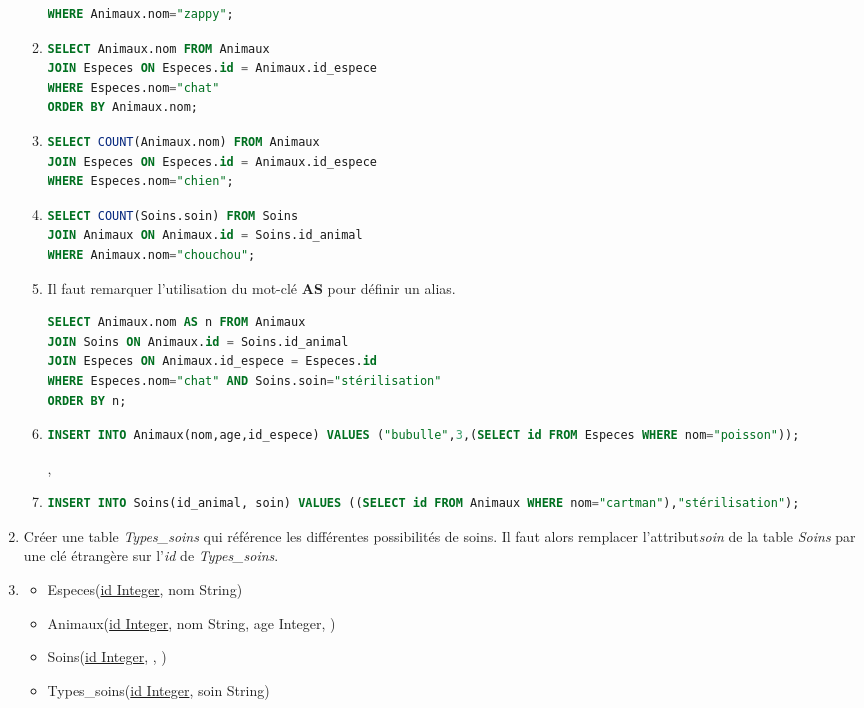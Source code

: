 \documentclass[a4paper,11pt]{article}
\begin{document}
\begin{Form}
\begin{exo}
\begin{enumerate}
\begin{enumerate}
\begin{lstlisting}[language=SQL]
WHERE Animaux.nom="zappy";
\end{lstlisting}
\item 
\begin{lstlisting}[language=SQL]
SELECT Animaux.nom FROM Animaux
JOIN Especes ON Especes.id = Animaux.id_espece
WHERE Especes.nom="chat"
ORDER BY Animaux.nom;
\end{lstlisting}
\item 
\begin{lstlisting}[language=SQL]
SELECT COUNT(Animaux.nom) FROM Animaux
JOIN Especes ON Especes.id = Animaux.id_espece
WHERE Especes.nom="chien";
\end{lstlisting}
\item 
\begin{lstlisting}[language=SQL]
SELECT COUNT(Soins.soin) FROM Soins
JOIN Animaux ON Animaux.id = Soins.id_animal
WHERE Animaux.nom="chouchou";
\end{lstlisting}
\item Il faut remarquer l'utilisation du mot-clé \textbf{AS} pour définir un alias.
\begin{lstlisting}[language=SQL]
SELECT Animaux.nom AS n FROM Animaux
JOIN Soins ON Animaux.id = Soins.id_animal
JOIN Especes ON Animaux.id_espece = Especes.id
WHERE Especes.nom="chat" AND Soins.soin="stérilisation"
ORDER BY n;
\end{lstlisting}
\item
\begin{lstlisting}[language=SQL]
INSERT INTO Animaux(nom,age,id_espece) VALUES ("bubulle",3,(SELECT id FROM Especes WHERE nom="poisson")); 
\end{lstlisting},
\item
\begin{lstlisting}[language=SQL]
INSERT INTO Soins(id_animal, soin) VALUES ((SELECT id FROM Animaux WHERE nom="cartman"),"stérilisation");
\end{lstlisting}
\end{enumerate}
\item Créer une table \emph{Types\_soins} qui référence les différentes possibilités de soins. Il faut alors remplacer l'attribut\emph{soin} de la table \emph{Soins} par une clé étrangère sur l'\emph{id} de \emph{Types\_soins}.
\item 
\begin{itemize}
\item Especes(\underline{id Integer}, nom String)
\item Animaux(\underline{id Integer}, nom String, age Integer, )
\item Soins(\underline{id Integer}, , )
\item Types\_soins(\underline{id Integer}, soin String)
\end{itemize}


\end{enumerate}
\end{exo}
\end{Form}
\end{document}
